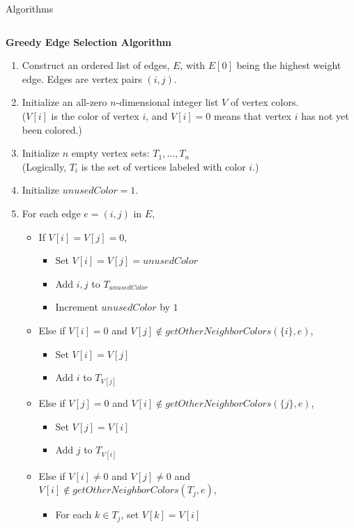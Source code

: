 \documentclass[serif,mathserif,final]{beamer}
\begin{document}
\begin{frame}{}
\begin{columns}[t]
\begin{column}{0.49\linewidth}
\begin{block}{\Huge Algorithms}
		\begin{columns}[t]
			\begin{column}{0.47\linewidth}

\begin{framed}
\noindent\textbf{\Large Greedy Edge Selection Algorithm}
\begin{enumerate}
\Large
\item Construct an ordered list of edges, $E$, with $E[0]$ being the highest weight edge. Edges are vertex pairs $(i,j)$.
\item Initialize an all-zero $n$-dimensional integer list $V$ of vertex colors. \\
($V[i]$ is the color of vertex $i$, and $V[i]=0$ means that vertex $i$ has not yet been colored.)
\item Initialize $n$ empty vertex sets: $T_1,...,T_n$\\
(Logically, $T_i$ is the set of vertices labeled with color $i$.)
\item Initialize $unusedColor=1$.
\item For each edge $e=(i,j)$ in $E$,
\begin{itemize}
\large
\item If $V[i]=V[j]=0$,
\begin{itemize}
\normalsize
\item Set $V[i]=V[j]=unusedColor$
\item Add $i,j$ to $T_{unusedColor}$
\item Increment $unusedColor$ by $1$
\end{itemize}
\item Else if $V[i]=0$ and $V[j]\notin getOtherNeighborColors(\{i\}, e)$,
\begin{itemize}
\normalsize
\item Set $V[i]=V[j]$
\item Add $i$ to $T_{V[j]}$
\end{itemize}
\item Else if $V[j]=0$ and $V[i]\notin getOtherNeighborColors(\{j\}, e)$,
\begin{itemize}
\normalsize
\item Set $V[j]=V[i]$
\item Add $j$ to $T_{V[i]}$
\end{itemize}
\item Else if  $V[i]\neq 0$ and $V[j]\neq 0$ and $V[i]\notin getOtherNeighborColors(T_j, e)$,
\begin{itemize}
\normalsize
\item For each $k\in T_j$, set $V[k]=V[i]$

\end{itemize}
\end{itemize}
\end{enumerate}
\end{framed}
\end{column}
\end{columns}
\end{block}
\end{column}
\end{columns}
\end{frame}
\end{document}
